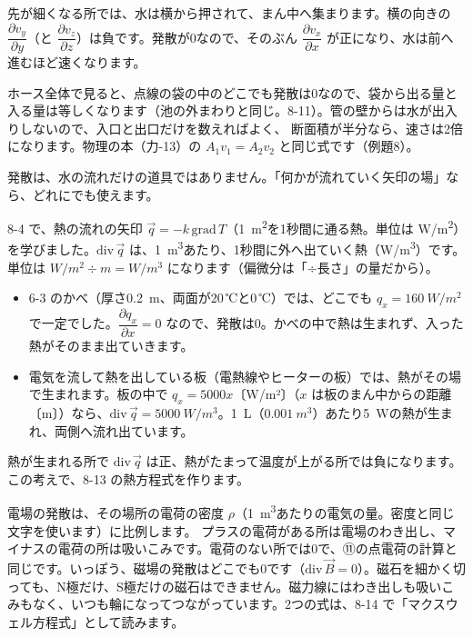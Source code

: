先が細くなる所では、水は横から押されて、まん中へ集まります。横の向きの $\dfrac{\partial v_y}{\partial y}$（と $\dfrac{\partial v_z}{\partial z}$）は負です。発散が0なので、そのぶん $\dfrac{\partial v_x}{\partial x}$ が正になり、水は前へ進むほど速くなります。

ホース全体で見ると、点線の袋の中のどこでも発散は0なので、袋から出る量と入る量は等しくなります（池の外まわりと同じ。8-11）。管の壁からは水が出入りしないので、入口と出口だけを数えればよく、
断面積が半分なら、速さは2倍になります。物理の本（力-13）の $A_1v_1=A_2v_2$ と同じ式です（例題8）。


\label{bk:8-9:netsu}発散は、水の流れだけの道具ではありません。「何かが流れていく矢印の場」なら、どれにでも使えます。

8-4 で、熱の流れの矢印 $\vec q=-k\,\mathrm{grad}\,T$（\qty{1}{m^2}を1秒間に通る熱。単位は \unit{W/m^2}）を学びました。$\mathrm{div}\,\vec q$ は、\qty{1}{m^3}あたり、1秒間に外へ出ていく熱（\unit{W/m^3}）です。単位は $\unit{W/m^2}\div\unit{m}=\unit{W/m^3}$ になります（偏微分は「÷長さ」の量だから）。

\begin{itemize}[label={\color{\bkTT}●}, leftmargin=1.6\zw, itemsep=2pt, topsep=2pt]
\item 6-3 のかべ（厚さ\qty{0.2}{m}、両面が20\,℃と0\,℃）では、どこでも $q_x=\qty{160}{W/m^2}$ で一定でした。$\dfrac{\partial q_x}{\partial x}=0$ なので、発散は0。かべの中で熱は生まれず、入った熱がそのまま出ていきます。
\item 電気を流して熱を出している板（電熱線やヒーターの板）では、熱がその場で生まれます。板の中で $q_x=5000x$〔W/m²〕（$x$ は板のまん中からの距離〔m〕）なら、$\mathrm{div}\,\vec q=\qty{5000}{W/m^3}$。\qty{1}{L}（$\qty{0.001}{m^3}$）あたり\qty{5}{W}の熱が生まれ、両側へ流れ出ています。
\end{itemize}
熱が生まれる所で $\mathrm{div}\,\vec q$ は正、熱がたまって温度が上がる所では負になります。この考えで、8-13 の熱方程式を作ります。

電場の発散は、その場所の電荷の密度 $\rho$（\qty{1}{m^3}あたりの電気の量。密度と同じ文字を使います）に比例します。
プラスの電荷がある所は電場のわき出し、マイナスの電荷の所は吸いこみです。電荷のない所では0で、⑪の点電荷の計算と同じです。いっぽう、磁場の発散はどこでも0です（$\mathrm{div}\,\vec B=0$）。磁石を細かく切っても、N極だけ、S極だけの磁石はできません。磁力線にはわき出しも吸いこみもなく、いつも輪になってつながっています。2つの式は、8-14 で「マクスウェル方程式」として読みます。



